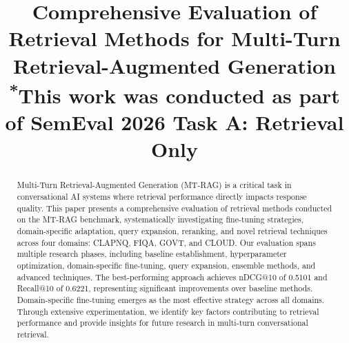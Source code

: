 \documentclass[conference]{IEEEtran}
\begin{document}
\title{Comprehensive Evaluation of Retrieval Methods for Multi-Turn Retrieval-Augmented Generation\\
{\footnotesize \textsuperscript{*}This work was conducted as part of SemEval 2026 Task A: Retrieval Only}
}

\author{
\and
{}
\and
{}
}

\maketitle

\begin{abstract}
Multi-Turn Retrieval-Augmented Generation (MT-RAG) is a critical task in conversational AI systems where retrieval performance directly impacts response quality. This paper presents a comprehensive evaluation of retrieval methods conducted on the MT-RAG benchmark, systematically investigating fine-tuning strategies, domain-specific adaptation, query expansion, reranking, and novel retrieval techniques across four domains: CLAPNQ, FIQA, GOVT, and CLOUD. Our evaluation spans multiple research phases, including baseline establishment, hyperparameter optimization, domain-specific fine-tuning, query expansion, ensemble methods, and advanced techniques. The best-performing approach achieves nDCG@10 of 0.5101 and Recall@10 of 0.6221, representing significant improvements over baseline methods. Domain-specific fine-tuning emerges as the most effective strategy across all domains. Through extensive experimentation, we identify key factors contributing to retrieval performance and provide insights for future research in multi-turn conversational retrieval.
\end{abstract}
\end{document}

